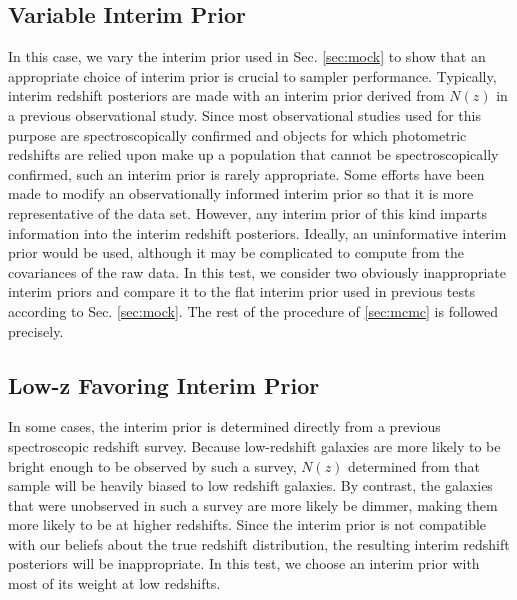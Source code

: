 \documentclass[preprint]{aastex}
\begin{document}
\begin{figure}
\caption{}
\label{fig:dumbestparam}
\end{figure}

\clearpage
\subsection{Variable Interim Prior}
\label{sec:interim}

In this case, we vary the interim prior used in Sec. \ref{sec:mock} to show 
that an appropriate choice of interim prior is crucial to sampler performance.  
Typically, interim redshift posteriors are made with an interim prior derived 
from $N(z)$ in a previous observational study.  Since most observational 
studies used for this purpose are spectroscopically confirmed and objects for 
which photometric redshifts are relied upon make up a population that cannot be 
spectroscopically confirmed, such an interim prior is rarely appropriate.  Some 
efforts have been made to modify an observationally informed interim prior so 
that it is more representative of the data set.  \citep{she11}  However, any 
interim prior of this kind imparts information into the interim redshift 
posteriors.  Ideally, an uninformative interim prior would be used, although it 
may be complicated to compute from the covariances of the raw data.  In this 
test, we consider two obviously inappropriate interim priors and compare it to 
the flat interim prior used in previous tests according to Sec. \ref{sec:mock}. 
 The rest of the procedure of \ref{sec:mcmc} is followed precisely.

\clearpage
\subsection{Low-z Favoring Interim Prior}
\label{sec:lowz}

In some cases, the interim prior is determined directly from a previous 
spectroscopic redshift survey.  Because low-redshift galaxies are more likely 
to be bright enough to be observed by such a survey, $N(z)$ determined from 
that sample will be heavily biased to low redshift galaxies.  By contrast, the 
galaxies that were unobserved in such a survey are more likely be dimmer, 
making them more likely to be at higher redshifts.  Since the interim prior is 
not compatible with our beliefs about the true redshift distribution, the 
resulting interim redshift posteriors will be inappropriate.  In this test, we 
choose an interim prior with most of its weight at low redshifts.
\end{document}
